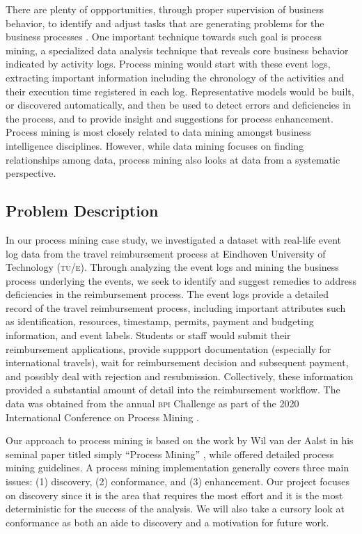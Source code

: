 \documentclass[conference]{IEEEtran}
\begin{document}
There are plenty of oppportunities, through
proper supervision of business behavior, to identify and adjust
tasks that are generating problems for the business processes
\cite{LeAl1994}.
One important technique towards such goal is process mining, a
specialized data analysis technique that reveals core business behavior
indicated by activity logs.
Process mining would start with these event logs, extracting important
information including the chronology of the activities
 and their execution time registered in each log. Representative models
would be built, or discovered automatically,
and then be used to detect errors and deficiencies in the process,
and to provide insight and suggestions for process enhancement.
Process mining is most closely related to data mining 
amongst business intelligence disciplines. However,
while data mining focuses on finding relationships among data,
process mining also looks at data from a systematic
perspective.

\subsection{Problem Description}

In our process mining case study, we investigated
a dataset with
real-life event log data from the travel reimbursement process at
Eindhoven University of Technology (\textsc{tu/e}). Through analyzing the event
logs and mining the business process underlying the events, we seek to
identify and suggest remedies to address deficiencies in the reimbursement
process.
The event logs provide a detailed record of the travel reimbursement process,
including important attributes such as identification, resources,
timestamp, permits, payment and budgeting information, and event labels.
Students or staff would submit their reimbursement applications,
provide suppport documentation (especially
for international travels), wait for
reimbursement decision and subsequent payment, and possibly deal with
rejection and resubmission.
Collectively, these information provided a substantial amount of detail
into the reimbursement workflow. 
The data was obtained from 
the annual \textsc{bpi} Challenge as part of
the 2020 International Conference on Process Mining \cite{BPI2020}.

Our approach to process mining is based on the work by
Wil van der Aalst in his seminal paper titled simply
``Process Mining'' \cite{van2012},
while offered detailed process mining guidelines.
A process mining implementation generally
covers three main issues: (1) discovery, (2) conformance,
and (3) enhancement.
Our project focuses on discovery since it is the area
that requires the most effort and it is the most deterministic for the
success of the analysis. We will also take a cursory
look at conformance as both an aide to discovery and a motivation for
future work.
\end{document}
